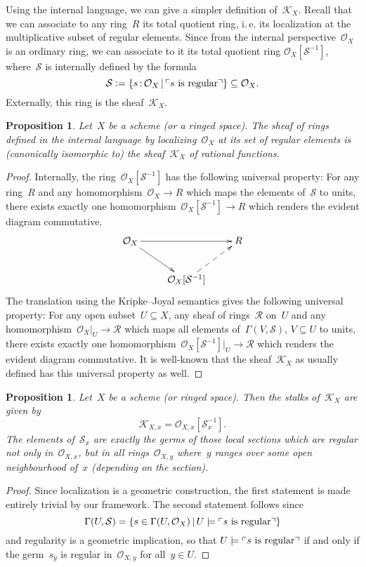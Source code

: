 \documentclass[10pt]{amsart}
\makeatletter
\theoremstyle{definition}
\theoremstyle{plain}
\newtheorem{prop}[defn]{Proposition}
\theoremstyle{remark}
\renewcommand{\O}{\mathcal{O}}
\newcommand{\K}{\mathcal{K}}
\newcommand{\R}{\mathcal{R}}
\renewcommand{\S}{\mathcal{S}}
\newcommand{\?}{\,{:}\,}
\renewcommand{\_}{\mathpunct{.}\,}
\newcommand{\speak}[1]{\ulcorner\text{\textnormal{#1}}\urcorner}
\newcommand{\ie}{i.\,e.\@\xspace}
\newcommand{\defeq}{\vcentcolon=}
\makeatother
\begin{document}
Using the internal language, we can give a simpler definition of~$\K_X$.
Recall that we can associate to any ring~$R$ its total quotient ring, \ie
its localization at the multiplicative subset of regular elements. Since from
the internal perspective~$\O_X$ is an ordinary ring, we can associate to it its
total quotient ring $\O_X[\S^{-1}]$,
where~$\S$ is internally defined by the formula
\[ \S \defeq \{ s\?\O_X \,|\, \speak{$s$ is regular} \} \subseteq \O_X. \]
Externally, this ring is the sheaf~$\K_X$.
\begin{prop}\label{prop:kx-internally}
Let~$X$ be a scheme (or a ringed space). The sheaf of rings defined
in the internal language by localizing~$\O_X$ at its set of regular elements is
(canonically isomorphic to) the sheaf~$\K_X$ of rational functions.
\end{prop}
\begin{proof}Internally, the ring~$\O_X[\S^{-1}]$ has the following
universal property: For any ring~$R$ and any homomorphism~$\O_X \to R$ which
maps the elements of~$\S$ to units, there exists exactly one
homomorphism~$\O_X[\S^{-1}] \to R$ which renders the evident diagram commutative.
\[ \xymatrix{
  \O_X \ar[rr] \ar[dr] && R \\
  & \O_X[\S^{-1}] \ar@{-->}[ru]
} \]
The translation using the Kripke--Joyal semantics gives the following universal
property: For any open subset~$U \subseteq X$, any sheaf of rings~$\R$ on~$U$ and any
homomorphism~$\O_X|_U \to \R$ which maps all elements of~$\Gamma(V,\S)$, $V
\subseteq U$ to units, there exists exactly one homomorphism~$\O_X[\S^{-1}]|_U \to
\R$ which renders the evident diagram commutative.
It is well-known that the sheaf~$\K_X$ as usually defined has
this universal property as well.
\end{proof}

\begin{prop}\label{prop:stalks-kx}
Let~$X$ be a scheme (or ringed space). Then the stalks of~$\K_X$
are given by
\[ \K_{X,x} = \O_{X,x}[\S_x^{-1}]. \]
The elements of~$\S_x$ are exactly the germs of those local sections which are
regular not only in~$\O_{X,x}$, but in all rings~$\O_{X,y}$ where~$y$
ranges over some open neighbourhood of~$x$ (depending on the section).\end{prop}
\begin{proof}
Since localization is a geometric construction, the first statement is made entirely
trivial by our framework. The second statement follows since
\[ \Gamma(U,\S) = \{ s\in\Gamma(U,\O_X) \,|\, U \models \speak{$s$ is regular}
\} \]
and regularity is a geometric implication, so that
$U \models \speak{$s$ is regular}$ if and only if the germ~$s_y$ is regular
in~$\O_{X,y}$ for all~$y \in U$.
\end{proof}
\end{document}
